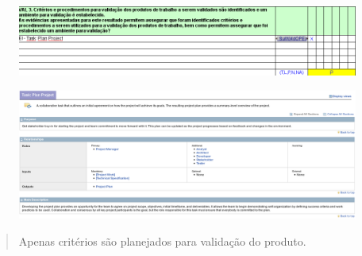 \begin{frame}
\begin{figure}[p]
    \centering
    \includegraphics[width=\textwidth]{conteudo/VAL3}
    \label{fig:Pattern}
\end{figure}	
\end{frame}
\begin{frame}
\begin{figure}[p]
    \centering
    \includegraphics[width=\textwidth]{conteudo/plan2}
    \label{fig:Pattern}
\end{figure}	
\begin{quote}
Apenas critérios são planejados para validação do produto.
\end{quote}
\end{frame}


